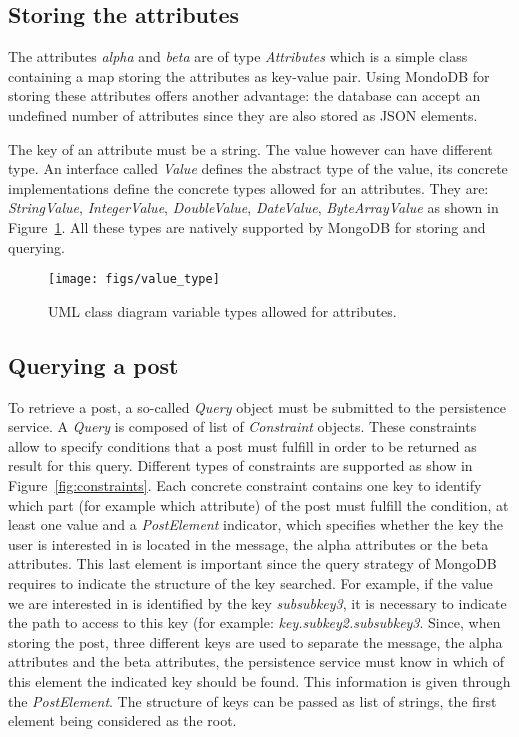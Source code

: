 \documentclass[oneside]{scrreprt}
\newcommand{\fig}[1]{Figure~\ref{#1}}
\begin{document}
\subsection{Storing the attributes}

The attributes \emph{alpha} and \emph{beta} are of type \emph{Attributes} which is a simple class containing a map storing the attributes as key-value pair. Using MondoDB for storing these attributes offers another advantage: the database can accept an undefined number of attributes since they are also stored as JSON elements.

The key of an attribute must be a string. The value however can have different type. An interface called \emph{Value} defines the abstract type of the value, its concrete implementations define the concrete types allowed for an attributes. They are: \emph{StringValue}, \emph{IntegerValue}, \emph{DoubleValue}, \emph{DateValue}, \emph{ByteArrayValue} as shown in \fig{fig:value-type}. All these types are natively supported by MongoDB for storing and querying.

\begin{figure}[ht]
\centerline{
\texttt{[image: figs/value\_type]}}
\caption{UML class diagram variable types allowed for attributes.}
\label{fig:value-type}
\end{figure}


\subsection{Querying a post}

To retrieve a post, a so-called \emph{Query} object must be submitted to the persistence service. A \emph{Query} is composed of list of \emph{Constraint} objects. These constraints allow to specify conditions that a post must fulfill in order to be returned as result for this query. Different types of constraints are supported as show in \fig{fig:constraints}. Each concrete constraint contains one key to identify which part (for example which attribute) of the post must fulfill the condition, at least one value and a \emph{PostElement} indicator, which specifies whether the key the user is interested in is located in the message, the alpha attributes or the beta attributes. This last element is important since the query strategy of MongoDB requires to indicate the structure of the key searched. For example, if the value we are interested in is identified by the key \emph{subsubkey3}, it is necessary to indicate the path to access to this key (for example: \emph{key.subkey2.subsubkey3}. Since, when storing the post, three different keys are used to separate the message, the alpha attributes and the beta attributes, the persistence service must know in which of this element the indicated key should be found. This information is given through the \emph{PostElement}. The structure of keys can be passed as list of strings, the first element being considered as the root.
\end{document}
